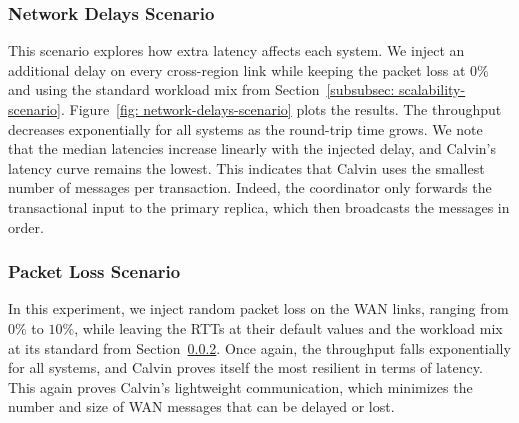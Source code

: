\subsubsection{Network Delays Scenario}
\label{subsubsec: network-delays-scenario}
This scenario explores how extra latency affects each system. We inject an additional delay on every cross-region link while keeping the packet loss at $0\%$ and using the standard workload mix from Section~\ref{subsubsec: scalability-scenario}. Figure~\ref{fig: network-delays-scenario} plots the results. The throughput decreases exponentially for all systems as the round-trip time grows. We note that the median latencies increase linearly with the injected delay, and Calvin's latency curve remains the lowest. This indicates that Calvin uses the smallest number of messages per transaction. Indeed, the coordinator only forwards the transactional input to the primary replica, which then broadcasts the messages in order. 

\subsubsection{Packet Loss Scenario}
\label{subsubsec: packet-loss-scenario}
In this experiment, we inject random packet loss on the WAN links, ranging from $0\%$ to $10\%$, while leaving the RTTs at their default values and the workload mix at its standard from Section~\ref{subsubsec: packet-loss-scenario}. Once again, the throughput falls exponentially for all systems, and Calvin proves itself the most resilient in terms of latency. This again proves Calvin's lightweight communication, which minimizes the number and size of WAN messages that can be delayed or lost.